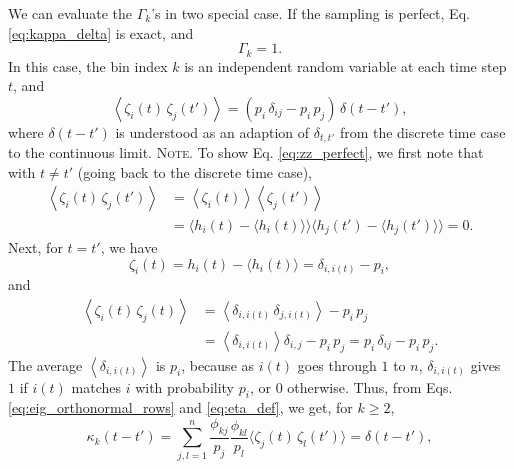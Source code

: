 \documentclass[reprint]{revtex4-1}
\newcommand{\note}[1]{{\color{DarkGreen}\footnotesize \textsc{Note.} #1}}
\begin{document}
We can evaluate the $\Gamma_k$'s
in two special case.
%
If the sampling is perfect,
Eq. \eqref{eq:kappa_delta} is exact, and
%
\begin{equation}
  \Gamma_k = 1.
  \label{eq:Gamma_perfect}
\end{equation}
%
In this case,
the bin index $k$ is an independent random variable
at each time step $t$, and
%
\begin{equation}
  \left\langle
    \zeta_i(t) \, \zeta_j(t')
  \right\rangle
  =
  \left( p_i \, \delta_{ij} - p_i \, p_j \right) \, \delta(t - t'),
  \label{eq:zz_perfect}
\end{equation}
%
where $\delta(t - t')$ is understood as an adaption of $\delta_{t, t'}$
from the discrete time case to the continuous limit. %
%
\note{To show Eq. \eqref{eq:zz_perfect}, we first note that
  with $t \ne t'$ (going back to the discrete time case),
  $$
  \begin{aligned}
  \left\langle
    \zeta_i(t) \, \zeta_j(t')
  \right\rangle
  &=
  \left\langle
    \zeta_i(t)
  \right\rangle
  \left\langle
    \zeta_j(t')
  \right\rangle
  \\
  &=
  \bigl\langle h_i(t)  - \langle h_i(t)  \rangle \bigr\rangle
  \bigl\langle h_j(t') - \langle h_j(t') \rangle \bigr\rangle
  =
  0.
  \end{aligned}
  $$
  Next, for $t = t'$, we have
  $$
  \zeta_i(t)
  = h_i(t) - \langle h_i(t) \rangle
  = \delta_{i, i(t)} - p_i,
  $$
  and
  $$
  \begin{aligned}
  \left\langle
    \zeta_i(t) \, \zeta_j(t)
  \right\rangle
  &=
  \left\langle
    \delta_{i, i(t)} \, \delta_{j, i(t)}
  \right\rangle
  -
  p_i \, p_j
  \\
  &=
  \left\langle
    \delta_{i, i(t)}
  \right\rangle
  \delta_{i, j}
  -
  p_i \, p_j
  =
  p_i \, \delta_{ij}
  - p_i \, p_j.
  \end{aligned}
  $$
  The average
  $\left\langle \delta_{i, i(t)} \right\rangle$ is $p_i$,
  because as $i(t)$ goes through $1$ to $n$,
  $\delta_{i, i(t)}$ gives $1$
  if $i(t)$ matches $i$ with probability $p_i$,
  or $0$ otherwise.
}
%
Thus, from Eqs. \eqref{eq:eig_orthonormal_rows} and \eqref{eq:eta_def},
we get, for $k \ge 2$,
%
\begin{equation}
  \kappa_k(t - t')
  =
  \sum_{j,l = 1}^n
  \frac{ \phi_{kj} } { p_j }
  \frac{ \phi_{kl} } { p_l }
  \langle \zeta_j(t) \, \zeta_l(t') \rangle
  = \delta(t - t'),
  \label{eq:kappa_perfect}
\end{equation}
%
\end{document}
